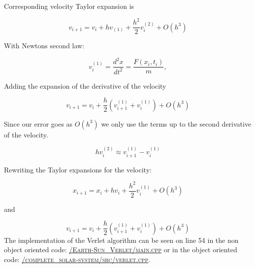 \documentclass[../main.tex]{subfiles}
\begin{document}
Corresponding velocity Taylor expansion is

\begin{equation}
  v_{i+1} = v_i + hv_{(1)} + \frac{h^2}{2} v_i^{(2)} + O(h^3)
\end{equation}

With Newtons second law:

\begin{equation}
  v_i^{(1)} = \frac{d^2x}{dt^2} = \frac{F(x_i, t_i)}{m},
\end{equation}

Adding the expansion of the derivative of the velocity

\begin{equation}
  v_{i+1} = v_i + \frac{h}{2}\left(v_{i+1}^{(1)} + v_i^{(1)}\right) + O(h^3)
\end{equation}

Since our error goes as $O(h^3)$ we only use the terms up to the second derivative of the velocity.

\begin{equation}
  hv_i^{(2)}\approx v_{i+1}^{(1)} - v_i^{(1)}
\end{equation}

Rewriting the Taylor expansions for the velocity:

\begin{equation}
  x_{i+1} = x_i + hv_i + \frac{h^2}{2} v_i^{(1)} + O(h^3)
\end{equation}

and

\begin{equation}
  v_{i+1} = v_i + \frac{h}{2} \left(v_{i+1}^{(1)} + v_i^{(1)}\right) + O(h^3)
\end{equation}
The implementation of the Verlet algorithm can be seen on line 54 in the non object oriented code: \href{https://github.com/kmaasrud/Project-5/blob/master/code/Earth-Sun_Verlet/main.cpp}{\textsc{/Earth-Sun\_Verlet/main.cpp}} or in the object oriented code: \href{https://github.com/kmaasrud/Project-5/blob/master/code/complete_solar-system/src/verlet.cpp}{\textsc{/complete\_solar-system/src/verlet.cpp}}.


\end{document}
